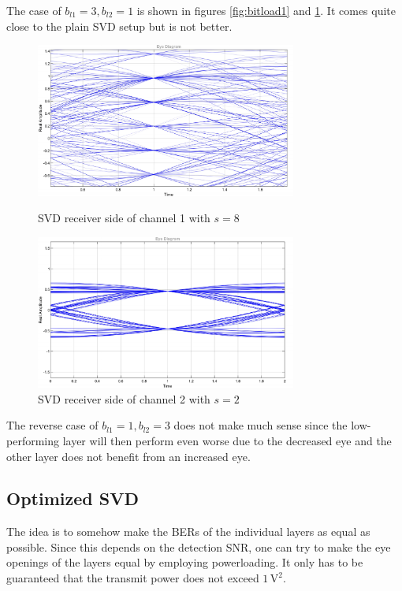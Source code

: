 \documentclass[10pt, a4paper]{article}
\begin{document}
The case of $b_{l1} = 3, b_{l2}=1$ is shown in figures \ref{fig:bitload1} and \ref{fig:bitload2}. It comes quite close to the plain SVD setup but is not better.\\

\begin{figure}[h]
    \centering
    \begin{minipage}{0.45\textwidth}
        \centering
        \includegraphics[width=0.764\textwidth]{graphics/mimo_eye_svd_bit82_ch_1.pdf}
        \caption{SVD receiver side of channel 1 with $s=8$}\label{fig:bitload1}
    \end{minipage}\hfill
    \begin{minipage}{0.45\textwidth}
        \centering
        \includegraphics[width=0.764\textwidth]{graphics/mimo_eye_svd_bit82_ch_2.pdf}
        \caption{SVD receiver side of channel 2 with $s=2$}\label{fig:bitload2}
    \end{minipage}
\end{figure}


The reverse case of $b_{l1}=1, b_{l2}=3$ does not make much sense since the low-performing layer will then perform even worse due to the decreased eye and the other layer does not benefit from an increased eye.

\subsection{Optimized SVD}
The idea is to somehow make the BERs of the individual layers as equal as possible. Since this depends on the detection SNR, one can try to make the eye openings of the layers equal by employing powerloading. It only has to be guaranteed that the transmit power does not exceed $1\,\si{\volt\squared}$.\\
\end{document}
